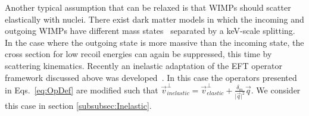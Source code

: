 	    Another typical assumption that can be relaxed is that WIMPs should scatter elastically with nuclei. There exist dark matter models in which the incoming and outgoing WIMPs have different mass states~\cite{InelasticIntro} separated by a keV-scale splitting. In the case where the outgoing state is more massive than the incoming state, the cross section for low recoil energies can again be suppressed, this time by scattering kinematics. Recently an inelastic adaptation of the EFT operator framework discussed above was developed~\cite{InelasticMath}. In this case the operators presented in Eqs.~\ref{eq:OpDef} are modified such that $\vec{v}^\perp_{inelastic} = \vec{v}^\perp_{elastic} +\frac{\delta_m}{\vert{\vec{q}}\vert^2}\vec{q}$. We consider this case in section \ref{subsubsec:Inelastic}.
%
%
